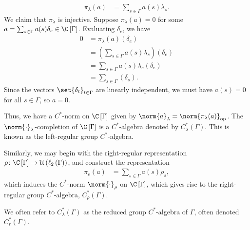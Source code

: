\documentclass[10pt]{mypackage}
\begin{document}
\begin{align*}
  \pi_{\lambda}\left(a\right) &= \sum_{s\in \Gamma}a(s)\lambda_s.
\end{align*}
We claim that $\pi_{\lambda}$ is injective. Suppose $\pi_{\lambda}\left(a\right) = 0$ for some $a = \sum_{s\in\Gamma}a(s)\delta_s\in \C\left[\Gamma\right]$. Evaluating $\delta_e$, we have
\begin{align*}
  0 &= \pi_{\lambda}\left(a\right)\left(\delta_e\right)\\
    &= \left(\sum_{s\in\Gamma}a(s)\lambda_s\right)\left(\delta_e\right)\\
    &= \sum_{s\in\Gamma}a(s)\lambda_s\left(\delta_e\right)\\
    &= \sum_{s\in\Gamma}\left(\delta_s\right).
\end{align*}
Since the vectors $\set{\delta_t}_{t\in\Gamma}$ are linearly independent, we must have $a(s) = 0$ for all $s\in \Gamma$, so $a = 0$.\newline

Thus, we have a $C^{\ast}$-norm on $\C\left[\Gamma\right]$ given by $\norm{a}_{\lambda} = \norm{\pi_{\lambda}(a)}_{\text{op}}$. The $\norm{\cdot}_{\lambda}$-completion of $\C\left[\Gamma\right]$ is a $C^{\ast}$-algebra denoted by $C^{\ast}_{\lambda}\left(\Gamma\right)$. This is known as the left-regular group $C^{\ast}$-algebra.\newline

Similarly, we may begin with the right-regular representation $\rho\colon \C\left[\Gamma\right]\rightarrow \mathcal{U}\left(\ell_2\left(\Gamma\right)\right)$, and construct the representation
\begin{align*}
  \pi_{\rho}\left(a\right) &= \sum_{s\in\Gamma}a(s)\rho_s,
\end{align*}
which induces the $C^{\ast}$-norm $\norm{\cdot}_{\rho}$ on $\C\left[\Gamma\right]$, which gives rise to the right-regular group $C^{\ast}$-algebra, $C^{\ast}_{\rho}\left(\Gamma\right)$.\newline

We often refer to $C^{\ast}_{\lambda}\left(\Gamma\right)$ as the reduced group $C^{\ast}$-algebra of $\Gamma$, often denoted $C_{r}^{\ast}\left(\Gamma\right)$.\newline
\end{document}
